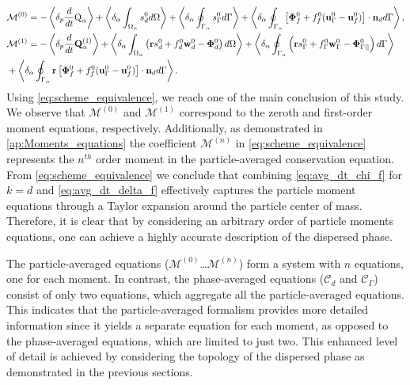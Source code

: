 \begin{align}
    &\mathcal{M}^{(0)}
    = 
    - \left<\delta_p \frac{d}{dt} {\text Q_\alpha}\right>
    + \left<\delta_\alpha \int_{\Omega_{\alpha}}  s_d^0  d\Omega\right>
    + \left<\delta_\alpha \oint_{\Gamma_{\alpha}}  s_\Gamma ^0  d\Gamma\right>
    + \left<\delta_\alpha \oint_{\Gamma_{\alpha}}  
    \left[\mathbf{\Phi}_f^0 
    + f_f^0 (\textbf{u}_\Gamma ^0-\textbf{u}_f^0) \right] \cdot \textbf{n}_d  d\Gamma\right>,\\
    &\mathcal{M}^{(1)} =
    -  \left<\delta_p \frac{d}{dt} {\textbf{Q}_\alpha^{(1)}}\right>
     + \left<\delta_\alpha \int_{\Omega_{\alpha}}  \left(
        \textbf{r} s_d^0         
        + f_d^0  \textbf{w}_d^0 
        - \mathbf{\Phi}_d^0
    \right)  d\Omega\right>
    + \left<\delta_\alpha \oint_{\Gamma_{\alpha}}  \left(
        \textbf{r}s_\Gamma ^0
        + f_\Gamma ^0 \textbf{w}_\Gamma ^0
        - \mathbf{\Phi}_{\Gamma||}^0
    \right)  d\Gamma\right> \nonumber\\
    &+ \left<\delta_\alpha \oint_{\Gamma_{\alpha}}  \textbf{r} \left[
        \mathbf{\Phi}_f^0
        + f_f^0 (\textbf{u}_\Gamma ^0-\textbf{u}_f^0)
    \right]\cdot \textbf{n}_d   d\Gamma\right>.
\end{align}
Using \ref{eq:scheme_equivalence}, we reach one of the main conclusion of this study. 
We observe that $\mathcal{M}^{(0)}$ and $\mathcal{M}^{(1)}$ correspond to the zeroth and first-order moment equations, respectively. 
Additionally, as demonstrated in \ref{ap:Moments_equations} the coefficient $\mathcal{M}^{(n)}$ in \ref{eq:scheme_equivalence} represents the $n^{th}$ order moment in the particle-averaged conservation equation. 
From \ref{eq:scheme_equivalence} we conclude that combining \ref{eq:avg_dt_chi_f} for $k=d$ and \ref{eq:avg_dt_delta_f} effectively captures the particle moment equations through a Taylor expansion around the particle center of mass. 
Therefore, it is clear that by considering an arbitrary order of particle moments equations, one can achieve a highly accurate description of the dispersed phase.


The particle-averaged equations ($\mathcal{M}^{(0)}$\ldots $\mathcal{M}^{(n)}$) form a system with $n$ equations, one for each moment. In contrast, the phase-averaged equations ($\mathcal{C}_d$ and $\mathcal{C}_\Gamma$) consist of only two equations, which aggregate all the particle-averaged equations. 
This indicates that the particle-averaged formalism provides more detailed information since it yields a separate equation for each moment, as opposed to the phase-averaged equations, which are limited to just two. 
This enhanced level of detail is achieved by considering the topology of the dispersed phase as demonstrated in the previous sections.




